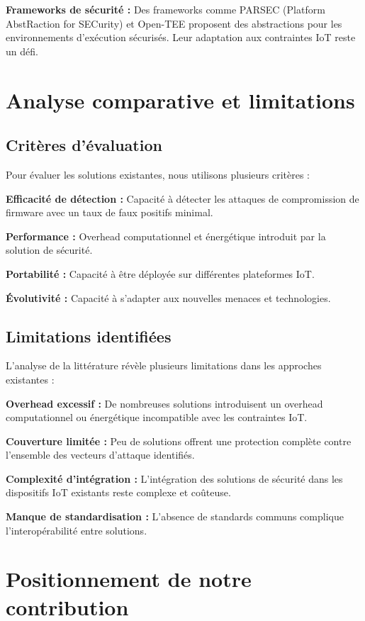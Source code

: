 \textbf{Frameworks de sécurité :} Des frameworks comme PARSEC (Platform AbstRaction for SECurity) et Open-TEE proposent des abstractions pour les environnements d'exécution sécurisés. Leur adaptation aux contraintes IoT reste un défi.

\section{Analyse comparative et limitations}

\subsection{Critères d'évaluation}

Pour évaluer les solutions existantes, nous utilisons plusieurs critères :

\textbf{Efficacité de détection :} Capacité à détecter les attaques de compromission de firmware avec un taux de faux positifs minimal.

\textbf{Performance :} Overhead computationnel et énergétique introduit par la solution de sécurité.

\textbf{Portabilité :} Capacité à être déployée sur différentes plateformes IoT.

\textbf{Évolutivité :} Capacité à s'adapter aux nouvelles menaces et technologies.

\subsection{Limitations identifiées}

L'analyse de la littérature révèle plusieurs limitations dans les approches existantes :

\textbf{Overhead excessif :} De nombreuses solutions introduisent un overhead computationnel ou énergétique incompatible avec les contraintes IoT.

\textbf{Couverture limitée :} Peu de solutions offrent une protection complète contre l'ensemble des vecteurs d'attaque identifiés.

\textbf{Complexité d'intégration :} L'intégration des solutions de sécurité dans les dispositifs IoT existants reste complexe et coûteuse.

\textbf{Manque de standardisation :} L'absence de standards communs complique l'interopérabilité entre solutions.

\section{Positionnement de notre contribution}

